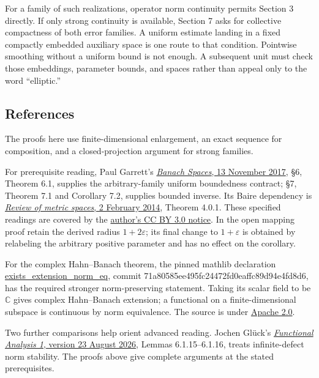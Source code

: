 \documentclass[
  11pt,
]{article}
\begin{document}
For a family of such realizations, operator norm continuity permits
Section 3 directly. If only strong continuity is available, Section 7
asks for collective compactness of both error families. A uniform
estimate landing in a fixed compactly embedded auxiliary space is one
route to that condition. Pointwise smoothing without a uniform bound is
not enough. A subsequent unit must check those embeddings, parameter
bounds, and spaces rather than appeal only to the word ``elliptic.''

\subsection{References}\label{references}

The proofs here use finite-dimensional enlargement, an exact sequence
for composition, and a closed-projection argument for strong families.

For prerequisite reading, Paul Garrett's
\href{https://www-users.cse.umn.edu/~garrett/m/fun/notes_2016-17/02_banach.pdf}{\emph{Banach
Spaces}, 13 November 2017}, §6, Theorem 6.1, supplies the
arbitrary-family uniform boundedness contract; §7, Theorem 7.1 and
Corollary 7.2, supplies bounded inverse. Its Baire dependency is
\href{https://www-users.cse.umn.edu/~garrett/m/fun/notes_2012-13/01_metric_spaces.pdf}{\emph{Review
of metric spaces}, 2 February 2014}, Theorem 4.0.1. These specified
readings are covered by the
\href{https://www-users.cse.umn.edu/~garrett/m/fun/}{author's CC BY 3.0
notice}. In the open mapping proof retain the derived radius
\(1+2\varepsilon\); its final change to \(1+\varepsilon\) is obtained by
relabeling the arbitrary positive parameter and has no effect on the
corollary.

For the complex Hahn--Banach theorem, the pinned mathlib declaration
\href{https://github.com/leanprover-community/mathlib4/blob/71a80585ee495fc24472fd0eaffc89d94e4fd8d6/Mathlib/Analysis/Normed/Module/HahnBanach.lean\#L38-L51}{exists\_extension\_norm\_eq},
commit 71a80585ee495fc24472fd0eaffc89d94e4fd8d6, has the required
stronger norm-preserving statement. Taking its scalar field to be
\(\mathbb C\) gives complex Hahn--Banach extension; a functional on a
finite-dimensional subspace is continuous by norm equivalence. The
source is under
\href{https://github.com/leanprover-community/mathlib4/blob/71a80585ee495fc24472fd0eaffc89d94e4fd8d6/LICENSE}{Apache
2.0}.

Two further comparisons help orient advanced reading. Jochen Glück's
\href{https://fan.uni-wuppertal.de/fileadmin/mathe/reine_mathematik/funktionalanalysis/glueck/Manuskripte/Lecture_Notes__Functional_Analysis_1.pdf}{\emph{Functional
Analysis 1}, version 23 August 2026}, Lemmas 6.1.15--6.1.16, treats
infinite-defect norm stability. The proofs above give complete arguments
at the stated prerequisites.
\end{document}
